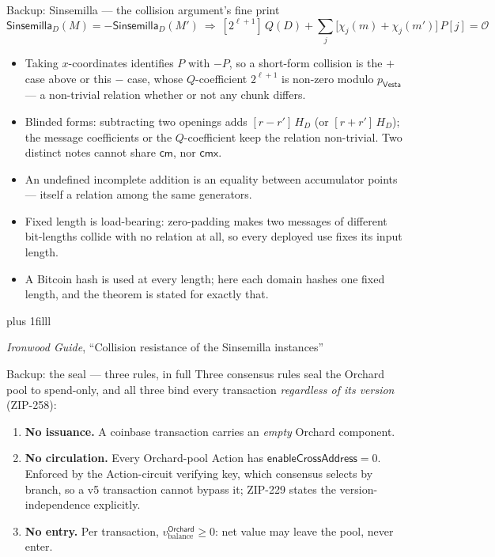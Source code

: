 \documentclass[aspectratio=169,11pt]{beamer}
\newcommand{\Vesta}{\ensuremath{\mathsf{Vesta}}}
\newcommand{\cmsym}{\ensuremath{\mathsf{cm}}}
\newcommand{\cmx}{\ensuremath{\mathsf{cmx}}}
\newcommand{\src}[1]{\par\vskip0pt plus 1filll
  {\fontsize{6}{7.2}\selectfont\color{arbdim}\raggedright #1\par}}
\begin{document}
\begin{frame}{Backup: Sinsemilla --- the collision argument's fine print}
\vspace*{-4pt}
\setlength{\abovedisplayskip}{3pt}\setlength{\belowdisplayskip}{3pt}
\[
\mathsf{Sinsemilla}_D(M) = -\mathsf{Sinsemilla}_D(M') \ \Longrightarrow\ 
[2^{\ell + 1}]\, Q(D) + \sum_{j}
  \bigl[\chi_j(m) + \chi_j(m')\bigr]\, P[j] = \mathcal{O}
\]
\begin{itemize}\small
  \item Taking $x$-coordinates identifies $P$ with $-P$, so a short-form
    collision is the $+$ case above or this $-$ case, whose
    $Q$-coefficient $2^{\ell + 1}$ is non-zero modulo $p_{\Vesta}$ ---
    a non-trivial relation whether or not any chunk differs.
  \item Blinded forms: subtracting two openings adds $[r - r']\,H_D$ (or
    $[r + r']\,H_D$); the message coefficients or the $Q$-coefficient keep
    the relation non-trivial. Two distinct notes cannot share $\cmsym$,
    nor $\cmx$.
  \item An undefined incomplete addition is an equality between
    accumulator points --- itself a relation among the same generators.
  \item Fixed length is load-bearing: zero-padding makes two messages of
    different bit-lengths collide with no relation at all, so every
    deployed use fixes its input length.
  \item A Bitcoin hash is used at every length; here each domain hashes
    one fixed length, and the theorem is stated for exactly that.
\end{itemize}
\src{\emph{Ironwood Guide}, ``Collision resistance of the Sinsemilla
  instances''}
\end{frame}

\begin{frame}{Backup: the seal --- three rules, in full}
Three consensus rules seal the Orchard pool to spend-only, and all three
bind every transaction \emph{regardless of its version} (ZIP-258):
\begin{enumerate}
  \item \textbf{No issuance.} A coinbase transaction carries an
    \emph{empty} Orchard component.
  \item \textbf{No circulation.} Every Orchard-pool Action has
    $\mathsf{enableCrossAddress} = 0$. Enforced by the Action-circuit
    verifying key, which consensus selects by branch, so a v5
    transaction cannot bypass it; ZIP-229 states the
    version-independence explicitly.
  \item \textbf{No entry.} Per transaction,
    $v_{\mathrm{balance}}^{\mathsf{Orchard}} \ge 0$: net value may leave
    the pool, never enter.
\end{enumerate}
\end{frame}
\end{document}
